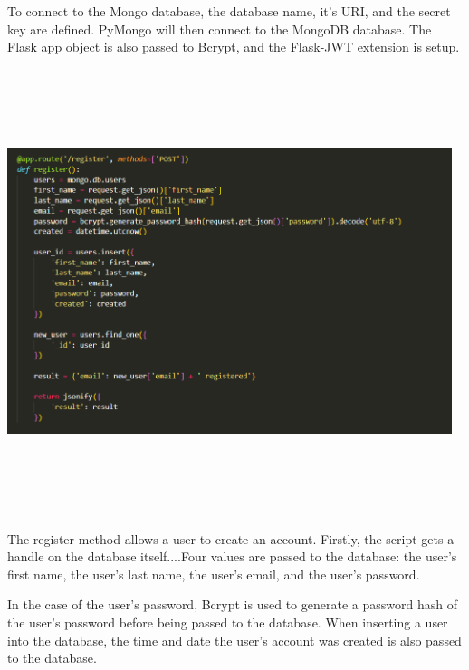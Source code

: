 To connect to the Mongo database, the database name, it's URI, and the secret key are defined. PyMongo will then connect to the MongoDB database. The Flask app object is also passed to Bcrypt, and the Flask-JWT extension is setup.

\newpage
\begin{center}
    \includegraphics[width=13cm,height=13cm,keepaspectratio]{images/backend2}
\end{center}
The register method allows a user to create an account. Firstly, the script gets a handle on the database itself....Four values are passed to the database: the user's first name, the user's last name, the user's email, and the user's password. 


In the case of the user's password, Bcrypt is used to generate a password hash of the user's password before being passed to the database. When inserting a user into the database, the time and date the user's account was created is also passed to the database.


